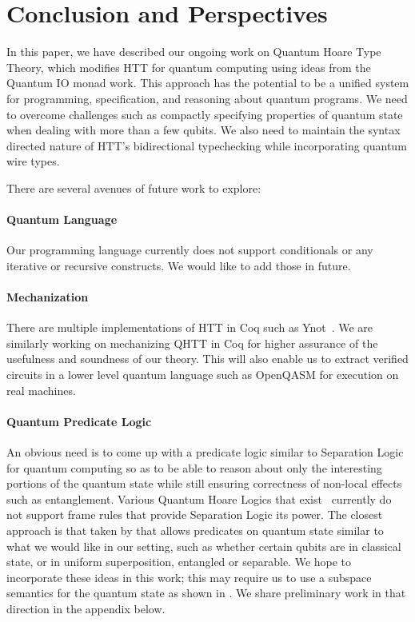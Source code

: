 \documentclass[acmsmall,nonacm,timestamp,review=false,anonymous=false]{acmart}
\begin{document}

\section{Conclusion and Perspectives}
\label{sec:conclusion}
In this paper, we have described our ongoing work on Quantum Hoare Type Theory, which modifies HTT for quantum computing using ideas from the Quantum IO monad work. This approach has the potential to be a unified system for programming, specification, and reasoning about quantum programs. We need to overcome challenges such as compactly specifying properties of quantum state when dealing with more than a few qubits. We also need to maintain the syntax directed nature of HTT's bidirectional typechecking while incorporating quantum wire types.

There are several avenues of future work to explore:

\paragraph{Quantum Language} Our programming language currently does not support conditionals or any iterative or recursive constructs. We would like to add those in future.

\paragraph{Mechanization} There are multiple implementations of HTT in Coq such as Ynot~\cite{ynot2008}. We are similarly working on mechanizing QHTT in Coq for higher assurance of the usefulness and soundness of our theory. This will also enable us to extract verified circuits in a lower level quantum language such as OpenQASM for execution on real machines.

\paragraph{Quantum Predicate Logic} An obvious need is to come up with a predicate logic similar to Separation Logic~\cite{reynolds2002} for quantum computing so as to be able to reason about only the interesting portions of the quantum state while still ensuring correctness of non-local effects such as entanglement. Various Quantum Hoare Logics that exist~\cite{ying_floydhoare_2012} currently do not support frame rules that provide Separation Logic its power. The closest approach is that taken by \citet{unruh2019} that allows predicates on quantum state similar to what we would like in our setting, such as whether certain qubits are in classical state, or in uniform superposition, entangled or separable. We hope to incorporate these ideas in this work; this may require us to use a subspace semantics for the quantum state as shown in \citet{unruh2019}. We share preliminary work in that direction in the appendix below.
\end{document}
